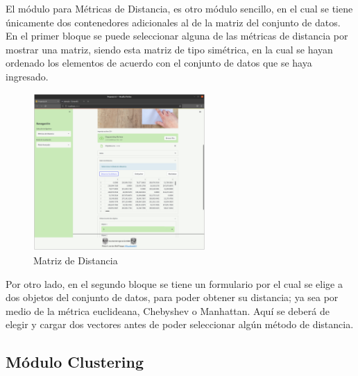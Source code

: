 \documentclass[10pt]{article}
\begin{document}
    El módulo para Métricas de Distancia, es otro módulo sencillo, en el cual se tiene únicamente dos contenedores adicionales al de la matriz del conjunto de datos. En el primer bloque se puede seleccionar alguna de las métricas de distancia por mostrar una matriz, siendo esta matriz de tipo simétrica, en la cual se hayan ordenado los elementos de acuerdo con el conjunto de datos que se haya ingresado.\newline
    
    \begin{figure}[H]
    \centering
    \includegraphics[height=6cm]{img/Metrica_salida.png}
    \caption{Matriz de Distancia}
    \label{fig:MetSalida}
    \end{figure}
    
    Por otro lado, en el segundo bloque se tiene un formulario por el cual se elige a dos objetos del conjunto de datos, para poder obtener su distancia; ya sea por medio de la métrica euclideana, Chebyshev o Manhattan. Aquí se deberá de elegir y cargar dos vectores antes de poder seleccionar algún método de distancia.\newline

\subsection{Módulo Clustering}
\end{document}

